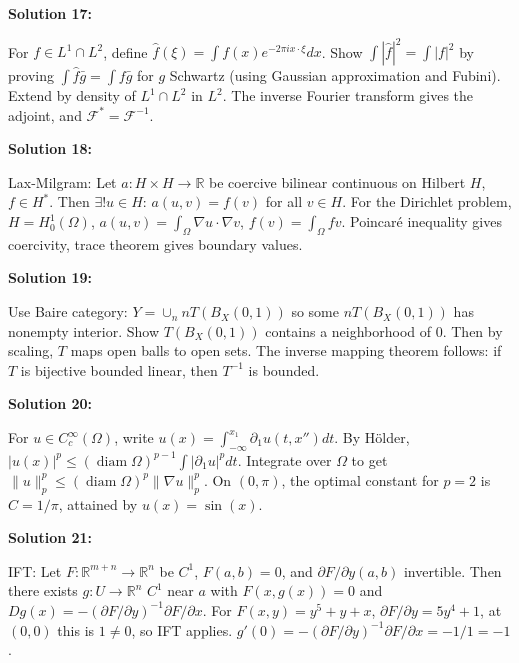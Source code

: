 \documentclass[12pt,a4paper]{exam}
\begin{document}
\vspace{0.5cm}

\textbf{Solution 17:}

For $f \in L^1 \cap L^2$, define $\widehat{f}(\xi) = \int f(x) e^{-2\pi i x \cdot \xi} dx$. Show $\int |\widehat{f}|^2 = \int |f|^2$ by proving $\int \widehat{f} \bar{g} = \int f \bar{g}$ for $g$ Schwartz (using Gaussian approximation and Fubini). Extend by density of $L^1 \cap L^2$ in $L^2$. The inverse Fourier transform gives the adjoint, and $\mathcal{F}^* = \mathcal{F}^{-1}$.

\vspace{0.5cm}

\textbf{Solution 18:}

Lax-Milgram: Let $a: H \times H \to \mathbb{R}$ be coercive bilinear continuous on Hilbert $H$, $f \in H^*$. Then $\exists! u \in H$: $a(u,v) = f(v)$ for all $v \in H$. For the Dirichlet problem, $H = H_0^1(\Omega)$, $a(u,v) = \int_\Omega \nabla u \cdot \nabla v$, $f(v) = \int_\Omega f v$. Poincar\'e inequality gives coercivity, trace theorem gives boundary values.

\vspace{0.5cm}

\textbf{Solution 19:}

Use Baire category: $Y = \cup_n n T(B_X(0,1))$ so some $nT(B_X(0,1))$ has nonempty interior. Show $T(B_X(0,1))$ contains a neighborhood of 0. Then by scaling, $T$ maps open balls to open sets. The inverse mapping theorem follows: if $T$ is bijective bounded linear, then $T^{-1}$ is bounded.

\vspace{0.5cm}

\textbf{Solution 20:}

For $u \in C_c^\infty(\Omega)$, write $u(x) = \int_{-\infty}^{x_1} \partial_1 u(t, x'') dt$. By H\"older, $|u(x)|^p \leq (\operatorname{diam}\Omega)^{p-1} \int |\partial_1 u|^p dt$. Integrate over $\Omega$ to get $\|u\|_p^p \leq (\operatorname{diam}\Omega)^p \|\nabla u\|_p^p$. On $(0,\pi)$, the optimal constant for $p=2$ is $C = 1/\pi$, attained by $u(x) = \sin(x)$.

\vspace{0.5cm}

\textbf{Solution 21:}

IFT: Let $F: \mathbb{R}^{m+n} \to \mathbb{R}^n$ be $C^1$, $F(a,b)=0$, and $\partial F/\partial y (a,b)$ invertible. Then there exists $g: U \to \mathbb{R}^n$ $C^1$ near $a$ with $F(x,g(x))=0$ and $Dg(x) = -(\partial F/\partial y)^{-1} \partial F/\partial x$. For $F(x,y) = y^5 + y + x$, $\partial F/\partial y = 5y^4 + 1$, at $(0,0)$ this is $1 \neq 0$, so IFT applies. $g'(0) = - (\partial F/\partial y)^{-1} \partial F/\partial x = -1/1 = -1$.
\end{document}
